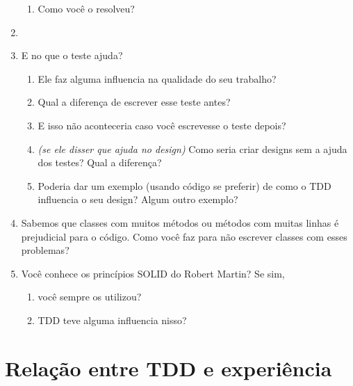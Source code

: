 \begin{enumerate}
\begin{enumerate}
		  \item Como você o resolveu?
		\end{enumerate}

	\item 

	\item E no que o teste ajuda?
	\begin{enumerate}
		\item Ele faz alguma influencia na qualidade do seu trabalho?

		\item Qual a diferença de escrever esse teste antes?

		\item E isso não aconteceria caso você escrevesse o teste depois?

		\item \textit{(se ele disser que ajuda no design)} Como seria criar designs
		sem a ajuda dos testes? Qual a diferença?

		\item Poderia dar um exemplo (usando código se preferir) de como o TDD
		influencia o seu design? Algum outro exemplo?

	\end{enumerate}

	\item Sabemos que classes com muitos métodos ou métodos com muitas linhas é
	prejudicial para o código. Como você faz para não escrever classes com esses problemas?

	\item Você conhece os princípios SOLID do Robert Martin? Se sim,
	\begin{enumerate}
		\item você sempre os utilizou?
		\item TDD teve alguma influencia nisso?
	\end{enumerate}
\end{enumerate}

\section{Relação entre TDD e experiência}

